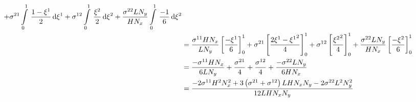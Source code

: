 \begin{equation}
\begin{aligned}
    +\conductivitytensorsymbol^{21}\gint{0}{1}{\dfrac{1-\xione}{2}}{\xione}
    +\conductivitytensorsymbol^{12}\gint{0}{1}{\dfrac{\xitwo}{2}}{\xitwo}
    +\dfrac{\conductivitytensorsymbol^{22} L N_{y}}{H N_{x}}\gint{0}{1}{\dfrac{-1}{6}}{\xitwo} \\
    &=\dfrac{\conductivitytensorsymbol^{11} H N_{x}}{L N_{y}}\sqbrac{\dfrac{-\xione}{6}}^{1}_{0}
    +\conductivitytensorsymbol^{21}\sqbrac{\dfrac{2\xione-\xionesq}{4}}^{1}_{0}
    +\conductivitytensorsymbol^{12}\sqbrac{\dfrac{\xitwosq}{4}}^{1}_{0}
    +\dfrac{\conductivitytensorsymbol^{22} L N_{y}}{H N_{x}}\sqbrac{\dfrac{-\xitwo}{6}}^{1}_{0} \\
    &=\dfrac{-\conductivitytensorsymbol^{11} H N_{x}}{6 L N_{y}}+\dfrac{\conductivitytensorsymbol^{21}}{4}+
    \dfrac{\conductivitytensorsymbol^{12}}{4}+\dfrac{-\conductivitytensorsymbol^{22} L N_{y}}{6 H N_{x}} \\
    &=\dfrac{-2\conductivitytensorsymbol^{11}H^{2}N_{x}^{2}+3\pbrac{\conductivitytensorsymbol^{21}+
        \conductivitytensorsymbol^{12}}L H N_{x} N_{y}-2\conductivitytensorsymbol^{22}L^{2}N_{y}^{2}}{12 L H N_{x} N_{y}}
  \end{aligned}
\end{equation}

